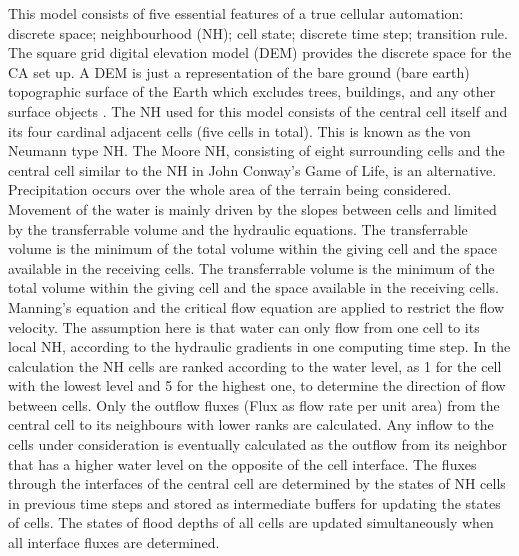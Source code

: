 This model consists of five essential features of a true cellular automation: discrete space; neighbourhood (NH); cell state; discrete time step; transition rule.
The square grid digital elevation model (DEM) provides the discrete space for the CA set up. A DEM is just a representation of the bare ground (bare earth) topographic surface of the Earth which excludes trees, buildings, and any other surface objects \cite{DEM}. The NH used for this model consists of the central cell itself and its four cardinal adjacent cells (five cells in total). This is known as the von Neumann type NH. The Moore NH, consisting of eight surrounding cells and the central cell similar to the NH in John Conway’s Game of Life, is an alternative. 
Precipitation occurs over the whole area of the terrain being considered. Movement of the water is mainly driven by the slopes between cells and limited by the transferrable volume and the hydraulic equations. The transferrable volume is the minimum of the total volume within the giving cell and the space available in the receiving cells. The transferrable volume is the minimum of the total volume within the giving cell and the space available in the receiving cells. Manning’s equation and the critical flow equation are applied to restrict the flow velocity. The assumption here is that water can only flow from one cell to its local NH, according to the hydraulic gradients in one computing time step. 
In the calculation the NH cells are ranked according to the water level, as 1 for the cell with the lowest level and 5 for the highest one, to determine the direction of flow between cells. Only the outflow fluxes (Flux as flow rate per unit area) from the central cell to its neighbours with lower ranks are calculated. Any inflow to the cells under consideration is eventually calculated as the outflow from its neighbor that has a higher water level on the opposite of the cell interface.
The fluxes through the interfaces of the central cell are determined by the states of NH cells in previous time steps and stored as intermediate buffers for updating the states of cells. The states of flood depths of all cells are updated simultaneously when all interface fluxes are determined.

